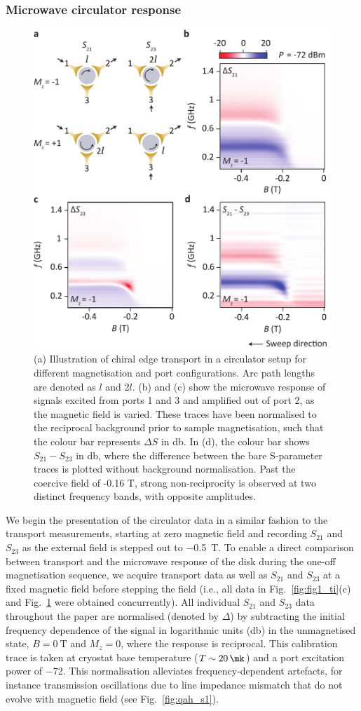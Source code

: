 \subsubsection{Microwave circulator response}
\begin{figure}
\includegraphics[width=0.7\linewidth]{Fig2_TI}
\caption[Microwave transmission measurement of 3D-TI based circulator]{\label{fig:fig2_ti}(a) Illustration of chiral edge transport in a circulator setup for different magnetisation and port configurations. Arc path lengths are denoted as $l$ and 2$l$. (b) and (c) show the microwave response of signals excited from ports 1 and 3 and amplified out of port 2, as the  magnetic field is varied. These traces have been normalised to the reciprocal background prior to sample magnetisation, such that the colour bar represents $\Delta S$ in \si{\decibel}. In (d), the colour bar shows $S_{21} - S_{23}$ in \si{\decibel}, where the difference between the bare S-parameter traces is plotted without background normalisation. Past the coercive field of -0.16 T, strong non-reciprocity is observed at two distinct frequency bands, with opposite amplitudes.}
\end{figure}
We begin the presentation of the circulator data in a similar fashion to the transport measurements, starting at zero magnetic field and recording $S_{21}$ and $S_{23}$ as the external field is stepped out to \SI{-0.5}{\tesla}. To enable a direct comparison between transport and the microwave response of the disk during the one-off magnetisation sequence, we acquire transport data as well as $S_{21}$ and $S_{23}$ at a fixed magnetic field before stepping the field (i.e., all data in Fig.~\ref{fig:fig1_ti}(c) and Fig.~\ref{fig:fig2_ti} were obtained concurrently). All individual $S_{21}$ and $S_{23}$ data throughout the paper are normalised (denoted by $\Delta$) by subtracting the initial frequency dependence of the signal in logarithmic units (\si{\decibel}) in the unmagnetised state, $B = \SI{0}{\tesla}$ and $M_z = 0$, where the response is reciprocal. This calibration trace is taken at cryostat base temperature ($T \sim \SI{20}{\mk}$) and a port excitation power of \SI{-72}{\dBm}.  This normalisation alleviates frequency-dependent artefacts, for instance transmission oscillations due to line impedance mismatch that do not evolve with magnetic field (see Fig.~\ref{fig:qah_s1}).

